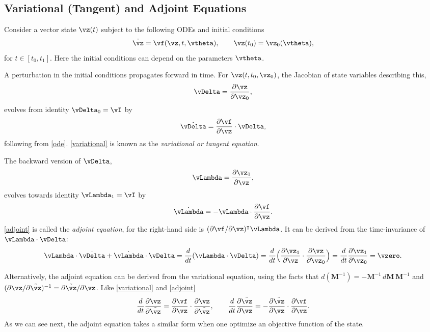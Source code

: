 \documentclass[modern, trackchanges, dvipsnames]{aastex631}
\renewcommand{\d}{d}
\newcommand{\p}{\partial}
\begin{document}
\vspace{1em}
\subsection{Variational (Tangent) and Adjoint Equations}

Consider a vector state $\vz(t)$ subject to the following ODEs and
initial conditions
%
\begin{equation}
\dot\vz = \vf(\vz, t, \vtheta),
\qquad
\vz(t_0) = \vz_0(\vtheta),
\label{ode}
\end{equation}
%
for $t \in [t_0, t_1]$.
Here the initial conditions can depend on the parameters $\vtheta$.

A perturbation in the initial conditions propagates forward in time.
For $\vz(t, t_0, \vz_0)$, the Jacobian of state variables describing
this,
%
\begin{equation}
\vDelta = \frac{\p\vz}{\p\vz_0},
\end{equation}
%
evolves from identity $\vDelta_0 = \vI$ by
%
\begin{equation}
\dot\vDelta = \frac{\p\vf}{\p\vz} \cdot \vDelta,
\label{variational}
\end{equation}
%
following from \eqref{ode}.
\eqref{variational} is known as the \emph{variational or tangent
equation}.

The backward version of $\vDelta$,
%
\begin{equation}
\vLambda = \frac{\p\vz_1}{\p\vz},
\end{equation}
%
evolves towards identity $\vLambda_1 = \vI$ by
%
\begin{equation}
\dot\vLambda = - \vLambda \cdot \frac{\p\vf}{\p\vz}.
\label{adjoint}
\end{equation}
%
\eqref{adjoint} is called the \emph{adjoint equation}, for the
right-hand side is $(\p\vf / \p\vz)^\intercal \vLambda$.
It can be derived from the time-invariance of $\vLambda \cdot \vDelta$:
%
\begin{equation}
\vLambda \cdot \dot\vDelta + \dot\vLambda \cdot \vDelta
= \frac\d{\d t} (\vLambda \cdot \vDelta)
= \frac\d{\d t} \Bigl( \frac{\p\vz_1}{\p\vz}
  \cdot \frac{\p\vz}{\p\vz_0} \Bigr)
= \frac\d{\d t} \frac{\p\vz_1}{\p\vz_0}
= \vzero.
\end{equation}

Alternatively, the adjoint equation can be derived from the variational
equation, using the facts that $\d (\bm{M}^{-1}) = - \bm{M}^{-1} \, \d
\bm{M} \, \bm{M}^{-1}$ and $(\p\vz / \p\tilde\vz)^{-1} = \p\tilde\vz /
\p\vz$.
Like \eqref{variational} and \eqref{adjoint}
%
\begin{equation}
\frac\d{\d t} \frac{\p\vz}{\p\tilde\vz}
= \frac{\p\vf}{\p\vz} \cdot \frac{\p\vz}{\p\tilde\vz},
\qquad
\frac\d{\d t} \frac{\p\tilde\vz}{\p\vz}
= - \frac{\p\tilde\vz}{\p\vz} \cdot \frac{\p\vf}{\p\vz}.
\end{equation}
As we can see next, the adjoint equation takes a similar form when one
optimize an objective function of the state.
\end{document}
